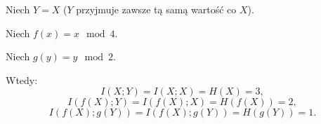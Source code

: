 Niech $Y = X$ ($Y$ przyjmuje zawsze tą samą wartość co $X$).

Niech $f(x) = x \mod 4$.

Niech $g(y) = y \mod 2$.

Wtedy:
$$
I(X; Y) = I(X; X) = H(X) = 3,
$$
$$
I(f(X); Y) = I(f(X); X) = H(f(X)) = 2,
$$
$$
I(f(X); g(Y)) = I(f(X); g(Y)) = H(g(Y)) = 1.
$$




